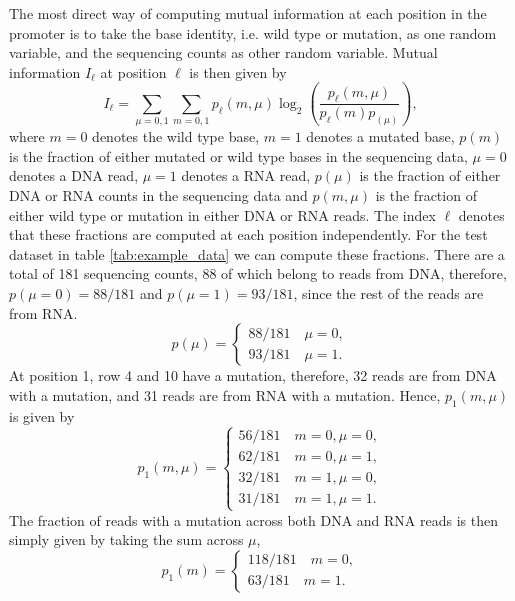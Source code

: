 \iffalse
The most direct way of computing mutual information at each position in the promoter is to take the base identity, i.e. wild type or mutation, as one random variable, and the sequencing counts as other random variable. Mutual information $I_\ell$ at position $\ell$ is then given by
\begin{equation}
    I_\ell = \sum_{\mu=0, 1}\sum_{m=0, 1} p_{\ell}(m, \mu)\log_2\left(\frac{p_{\ell}(m, \mu)}{p_{\ell}(m)p_(\mu)}\right),
\end{equation}
where $m=0$ denotes the wild type base, $m=1$ denotes a mutated base, $p(m)$ is the fraction of either mutated or wild type bases in the sequencing data, $\mu=0$ denotes a DNA read, $\mu=1$ denotes a RNA read, $p(\mu)$ is the fraction of either DNA or RNA counts in the sequencing data and $p(m, \mu)$ is the fraction of either wild type or mutation in either DNA or RNA reads. The index $\ell$ denotes that these fractions are computed at each position independently. For the test dataset in table \ref{tab:example_data} we can compute these fractions. There are a total of 181 sequencing counts, 88 of which belong to reads from DNA, therefore, $p(\mu=0) = 88/181$ and $p(\mu=1)=93/181$, since the rest of the reads are from RNA.
\begin{equation}
    p(\mu) = \begin{cases}
        88/181\quad\mu=0,\\
        93/181\quad\mu=1.
    \end{cases}
\end{equation}
At position 1, row 4 and 10 have a mutation, therefore, 32 reads are from DNA with a mutation, and 31 reads are from RNA with a mutation. Hence, $p_{1}(m, \mu)$ is given by 
\begin{equation}
    p_1(m, \mu) = \begin{cases}
        56/181\quad m=0,\mu=0,\\
        62/181\quad m=0,\mu=1,\\
        32/181\quad m=1,\mu=0,\\
        31/181\quad m=1,\mu=1.
    \end{cases}
\end{equation}
The fraction of reads with a mutation across both DNA and RNA reads is then simply given by taking the sum across $\mu$,
\begin{equation}
    p_1(m) = \begin{cases}
        118/181\quad m=0,\\
        63/181\quad m=1.
    \end{cases}
\end{equation}
